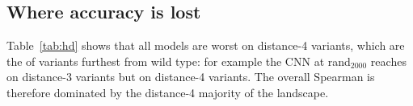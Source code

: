 \begin{table}[t]\footnotesize\centering\renewcommand{\arraystretch}{0.8}
\caption{Mean Spearman on Hamming-distance-3 and 4 test variants: random minus single/double training at equal $N$.}\label{tab:gap}
\resizebox{\columnwidth}{!}{}
\end{table}

\subsection{Where accuracy is lost}
Table~\ref{tab:hd} shows that all models are worst on distance-4 variants, which are the  of  variants furthest from wild type: for example the CNN at rand$_{2000}$ reaches  on distance-3 variants but  on distance-4 variants. The overall Spearman is therefore dominated by the distance-4 majority of the landscape.

